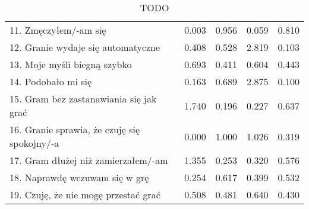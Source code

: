 \begin{table}[h!]
\begin{center}
\begin{tabular}{|m{10em}|m{5em}|m{5em}|m{5em}|m{5em}|}
            11. Zmęczyłem/-am się                                             & 0.003                       & 0.956            & 0.059                   & 0.810        \\
            12. Granie wydaje się automatyczne                                & 0.408                       & 0.528            & 2.819                   & 0.103        \\
            13. Moje myśli \newline biegną szybko                             & 0.693                       & 0.411            & 0.604                   & 0.443        \\
            14. Podobało mi się                                               & 0.163                       & 0.689            & 2.875                   & 0.100        \\
            15. Gram bez zastanawiania się jak grać                           & 1.740                       & 0.196            & 0.227                   & 0.637        \\
            16. Granie sprawia, \newline że czuję się spokojny/-a             & 0.000                       & 1.000            & 1.026                   & 0.319        \\
            17. Gram dłużej \newline niż zamierzałem/-am                      & 1.355                       & 0.253            & 0.320                   & 0.576        \\
            18. Naprawdę wczuwam się w grę                                    & 0.254                       & 0.617            & 0.399                   & 0.532        \\
            19. Czuję, że nie mogę przestać grać                              & 0.508                       & 0.481            & 0.640                   & 0.430        \\
            \hline
        \end{tabular}
    \end{center}
    \caption{TODO}\label{tab1:ch7_12}
\end{table}

